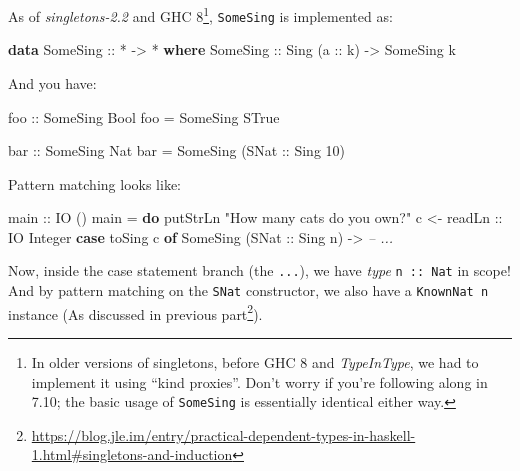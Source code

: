\documentclass[]{article}
\newenvironment{Shaded}{}{}
\newcommand{\KeywordTok}[1]{\textcolor[rgb]{0.00,0.44,0.13}{\textbf{{#1}}}}
\newcommand{\DataTypeTok}[1]{\textcolor[rgb]{0.56,0.13,0.00}{{#1}}}
\newcommand{\DecValTok}[1]{\textcolor[rgb]{0.25,0.63,0.44}{{#1}}}
\newcommand{\StringTok}[1]{\textcolor[rgb]{0.25,0.44,0.63}{{#1}}}
\newcommand{\CommentTok}[1]{\textcolor[rgb]{0.38,0.63,0.69}{\textit{{#1}}}}
\newcommand{\OtherTok}[1]{\textcolor[rgb]{0.00,0.44,0.13}{{#1}}}
\newcommand{\FunctionTok}[1]{\textcolor[rgb]{0.02,0.16,0.49}{{#1}}}
\newcommand{\NormalTok}[1]{{#1}}
\renewcommand{\href}[2]{#2\footnote{\url{#1}}}
\begin{document}
As of \emph{singletons-2.2} and GHC 8\footnote{In older versions of singletons,
  before GHC 8 and \emph{TypeInType}, we had to implement it using ``kind
  proxies''. Don't worry if you're following along in 7.10; the basic usage of
  \texttt{SomeSing} is essentially identical either way.}, \texttt{SomeSing} is
implemented as:

\begin{Shaded}
\begin{Highlighting}[]
\KeywordTok{data} \DataTypeTok{SomeSing}\OtherTok{ ::} \FunctionTok{*} \OtherTok{->} \FunctionTok{*} \KeywordTok{where}
    \DataTypeTok{SomeSing}\OtherTok{ ::} \DataTypeTok{Sing} \NormalTok{(}\OtherTok{a ::} \NormalTok{k) }\OtherTok{->} \DataTypeTok{SomeSing} \NormalTok{k}
\end{Highlighting}
\end{Shaded}

And you have:

\begin{Shaded}
\begin{Highlighting}[]
\OtherTok{foo ::} \DataTypeTok{SomeSing} \DataTypeTok{Bool}
\NormalTok{foo }\FunctionTok{=} \DataTypeTok{SomeSing} \DataTypeTok{STrue}

\OtherTok{bar ::} \DataTypeTok{SomeSing} \DataTypeTok{Nat}
\NormalTok{bar }\FunctionTok{=} \DataTypeTok{SomeSing} \NormalTok{(}\DataTypeTok{SNat}\OtherTok{ ::} \DataTypeTok{Sing} \DecValTok{10}\NormalTok{)}
\end{Highlighting}
\end{Shaded}

Pattern matching looks like:

\begin{Shaded}
\begin{Highlighting}[]
\OtherTok{main ::} \DataTypeTok{IO} \NormalTok{()}
\NormalTok{main }\FunctionTok{=} \KeywordTok{do}
    \NormalTok{putStrLn }\StringTok{"How many cats do you own?"}
    \NormalTok{c }\OtherTok{<- readLn ::} \DataTypeTok{IO} \DataTypeTok{Integer}
    \KeywordTok{case} \NormalTok{toSing c }\KeywordTok{of}
      \DataTypeTok{SomeSing} \NormalTok{(}\DataTypeTok{SNat}\OtherTok{ ::} \DataTypeTok{Sing} \NormalTok{n) }\OtherTok{->} \CommentTok{-- ...}
\end{Highlighting}
\end{Shaded}

Now, inside the case statement branch (the \texttt{...}), we have \emph{type}
\texttt{n\ ::\ Nat} in scope! And by pattern matching on the \texttt{SNat}
constructor, we also have a \texttt{KnownNat\ n} instance (As discussed in
\href{https://blog.jle.im/entry/practical-dependent-types-in-haskell-1.html\#singletons-and-induction}{previous
part}).
\end{document}
